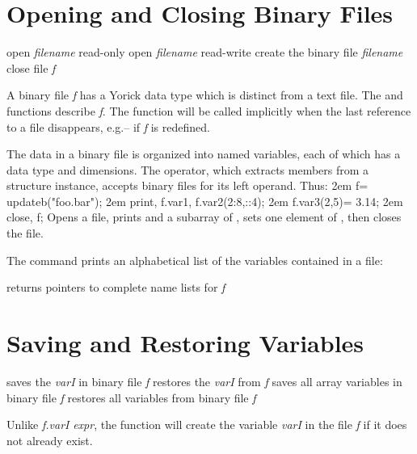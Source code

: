\section{Opening and Closing Binary Files}

     {open {\it filename\/} read-only}
     {open {\it filename\/} read-write}
     {create the binary file {\it filename\/}}
     {close file {\it f}}

A binary file {\it f\/} has a Yorick data type which is distinct from a text
file.  The  and  functions describe {\it f\/}.  The
 function will be called implicitly when the last reference to
a file disappears, e.g.-- if {\it f} is redefined.

The data in a binary file is organized into named variables, each of
which has a data type and dimensions.  The  operator, which extracts
members from a structure instance, accepts binary files for its left
operand.  Thus:
\beginexample
\hglue2em f= updateb("foo.bar");
\hglue2em print, f.var1, f.var2(2:8,::4);
\hglue2em f.var3(2,5)= 3.14;
\hglue2em close, f;
\endexample
Opens a file, prints  and a subarray of , sets one
element of , then closes the file.

The  command prints an alphabetical list of the variables
contained in a file:

     {returns pointers to complete name lists for {\it f}}

\section{Saving and Restoring Variables}

     {saves the {\it varI\/} in binary file {\it f}}
     {restores the {\it varI\/} from {\it f}}
     {saves all array variables in binary file {\it f}}
     {restores all variables from binary file {\it f}}

Unlike {\it f.varI\/}\kbd{=} {\it expr}, the  function will
create the variable {\it varI\/} in the file {\it f\/} if it does not
already exist.

